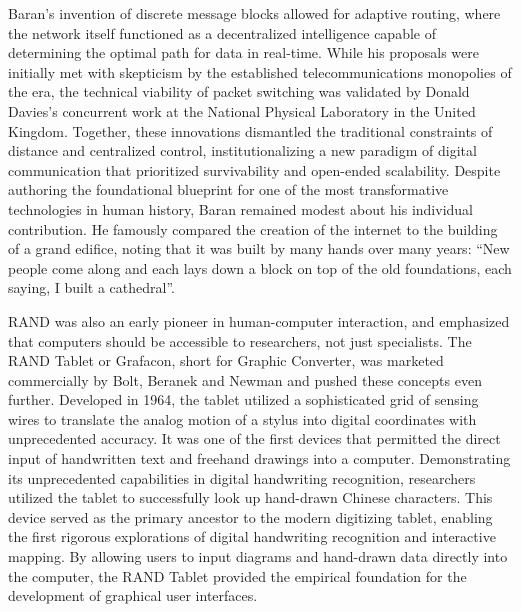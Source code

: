 Baran’s invention of discrete message blocks allowed for adaptive routing, where the network itself functioned as a decentralized intelligence capable of determining the optimal path for data in real-time. While his proposals were initially met with skepticism by the established telecommunications monopolies of the era, the technical viability of packet switching was validated by Donald Davies’s concurrent work at the National Physical Laboratory in the United Kingdom. Together, these innovations dismantled the traditional constraints of distance and centralized control, institutionalizing a new paradigm of digital communication that prioritized survivability and open-ended scalability. Despite authoring the foundational blueprint for one of the most transformative technologies in human history, Baran remained modest about his individual contribution. He famously compared the creation of the internet to the building of a grand edifice, noting that it was built by many hands over many years: “New people come along and each lays down a block on top of the old foundations, each saying, I built a cathedral”. 

RAND was also an early pioneer in human-computer interaction, and emphasized that computers should be accessible to researchers, not just specialists. The RAND Tablet or Grafacon, short for Graphic Converter, was marketed commercially by Bolt, Beranek and Newman and pushed these concepts even further. Developed in 1964, the tablet utilized a sophisticated grid of sensing wires to translate the analog motion of a stylus into digital coordinates with unprecedented accuracy. It was one of the first devices that permitted the direct input of handwritten text and freehand drawings into a computer. Demonstrating its unprecedented capabilities in digital handwriting recognition, researchers utilized the tablet to successfully look up hand-drawn Chinese characters. This device served as the primary ancestor to the modern digitizing tablet, enabling the first rigorous explorations of digital handwriting recognition and interactive mapping. By allowing users to input diagrams and hand-drawn data directly into the computer, the RAND Tablet provided the empirical foundation for the development of graphical user interfaces. 

